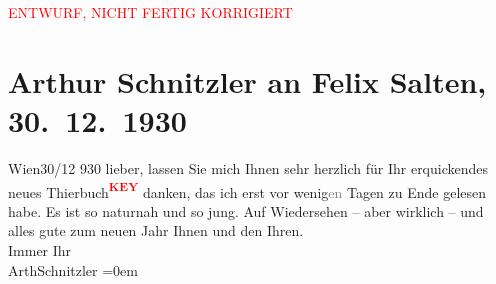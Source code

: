 
\begin{center}
            \textcolor{red}{ENTWURF, NICHT FERTIG KORRIGIERT}
                      \end{center}
            
         
         \renewcommand{\erwaehntePersonen}{Personen: Felix Salten}
         \renewcommand{\erwaehnteOrte}{Orte: Wien}
         \renewcommand{\erwaehnteWerke}{}
               \section[Arthur Schnitzler an Felix Salten, 30. 12. 1930]{ Arthur Schnitzler an Felix Salten, 30. 12. 1930}\nopagebreak{}\rehead{ }\begin{ledgroupsized}[t]{13cm}\normalsize\beginnumbering \toendnotes[C]{\smallbreak\pagebreak[2]} 
\pstart
           \raggedleft{}{\pb}Wien30/12 930\pend
           \pstart
           lieber, lassen Sie mich Ihnen sehr herzlich für Ihr erquickendes
               neues Thierbuch\textcolor{red}{\textsuperscript{\textbf{KEY}}} danken, das ich erst vor
                  wenig\textcolor{gray}{en} Tagen zu Ende gelesen habe. Es ist so naturnah und so
               jung. \pend
           \pstart
           Auf Wiedersehen – aber wirklich – und alles gute zum neuen Jahr Ihnen und den
               Ihren. {\\[\baselineskip]}Immer Ihr {\\[\baselineskip]}\spacefill\mbox{ArthSchnitzler}\pend
           \leftskip=0em{}
         
         \endnumbering{}\end{ledgroupsized}\begin{anhang}\end{anhang}\newcommand{\dateiname}{L03025}\newcommand{\titel}{Arthur Schnitzler an Felix Salten, 30. 12. 1930}\newcommand{\editorInnen}{Martin Anton Müller und Laura Untner}
      